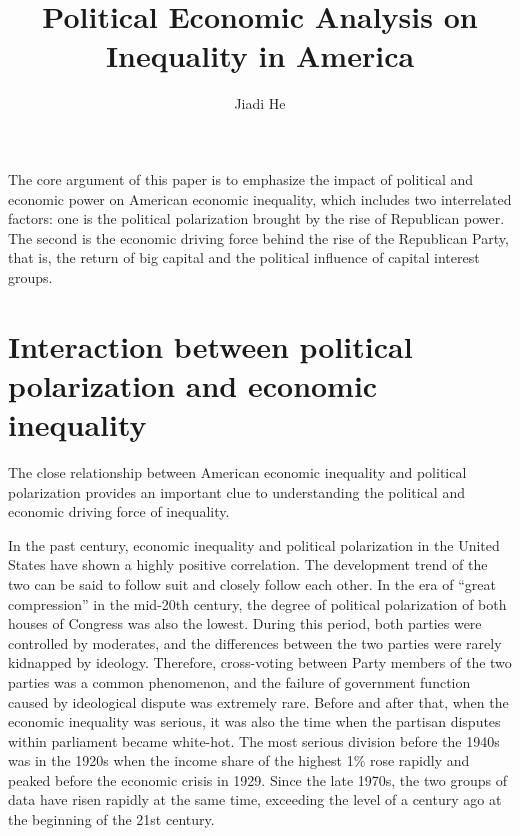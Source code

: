 \documentclass[11pt]{article}
\title{Political Economic Analysis on Inequality in America}
\author{Jiadi He}
\begin{document}
\maketitle
\keywordsline

The core argument of this paper is to emphasize the impact of political and economic power on American economic inequality, which includes two interrelated factors: one is the political polarization brought by the rise of Republican power. The second is the economic driving force behind the rise of the Republican Party, that is, the return of big capital and the political influence of capital interest groups.

\section{Interaction between political polarization and economic inequality}

The close relationship between American economic inequality and political polarization provides an important clue to understanding the political and economic driving force of inequality.

In the past century, economic inequality and political polarization in the United States have shown a highly positive correlation. The development trend of the two can be said to follow suit and closely follow each other. In the era of “great compression” in the mid-20th century, the degree of political polarization of both houses of Congress was also the lowest. During this period, both parties were controlled by moderates, and the differences between the two parties were rarely kidnapped by ideology. Therefore, cross-voting between Party members of the two parties was a common phenomenon, and the failure of government function caused by ideological dispute was extremely rare. Before and after that, when the economic inequality was serious, it was also the time when the partisan disputes within parliament became white-hot. The most serious division before the 1940s was in the 1920s when the income share of the highest 1\% rose rapidly and peaked before the economic crisis in 1929. Since the late 1970s, the two groups of data have risen rapidly at the same time, exceeding the level of a century ago at the beginning of the 21st century.
\end{document}
